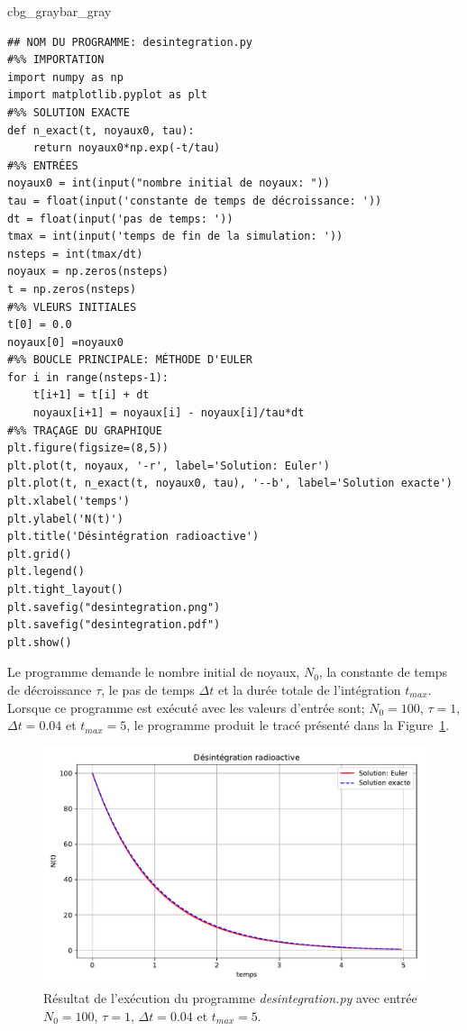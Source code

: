 \documentclass[%
oneside,                 %
final,                   %
10pt]{article}
\newenvironment{_pro_tight}[2]{
   \def\FrameCommand{\color{#2}\vrule width 1mm\normalcolor\colorbox{#1}}
   \FrameRule0.6pt\MakeFramed {\advance\hsize-2mm\FrameRestore}\vskip3mm}
   {\vskip0mm\endMakeFramed}
\newenvironment{pro}[2]{
\bgroup\rmfamily
\fboxsep=0mm\relax
\begin{_pro_tight}{#1}{#2}
\list{}{\parsep=-2mm\parskip=0mm\topsep=0pt\leftmargin=2mm
\rightmargin=2\leftmargin\leftmargin=4pt\relax}
\item\relax}
{\endlist\end{_pro_tight}\egroup}
\begin{document}
\begin{pro}{cbg_gray}{bar_gray}\begin{verbatim}
## NOM DU PROGRAMME: desintegration.py
#%% IMPORTATION
import numpy as np
import matplotlib.pyplot as plt
#%% SOLUTION EXACTE
def n_exact(t, noyaux0, tau):
    return noyaux0*np.exp(-t/tau)
#%% ENTRÉES
noyaux0 = int(input("nombre initial de noyaux: "))
tau = float(input('constante de temps de décroissance: '))
dt = float(input('pas de temps: '))
tmax = int(input('temps de fin de la simulation: '))
nsteps = int(tmax/dt)
noyaux = np.zeros(nsteps)
t = np.zeros(nsteps)
#%% VLEURS INITIALES
t[0] = 0.0
noyaux[0] =noyaux0
#%% BOUCLE PRINCIPALE: MÉTHODE D'EULER
for i in range(nsteps-1):
    t[i+1] = t[i] + dt
    noyaux[i+1] = noyaux[i] - noyaux[i]/tau*dt
#%% TRAÇAGE DU GRAPHIQUE
plt.figure(figsize=(8,5))
plt.plot(t, noyaux, '-r', label='Solution: Euler')
plt.plot(t, n_exact(t, noyaux0, tau), '--b', label='Solution exacte')
plt.xlabel('temps')
plt.ylabel('N(t)')
plt.title('Désintégration radioactive')
plt.grid()
plt.legend()
plt.tight_layout()
plt.savefig("desintegration.png")
plt.savefig("desintegration.pdf")
plt.show()
\end{verbatim}
\end{pro}
\noindent

Le programme demande le nombre initial de noyaux, $N_0$, la constante de temps de décroissance $\tau$, le pas de temps $\Delta t$ et la durée totale de l'intégration $t_{max}$. Lorsque ce programme est exécuté avec les valeurs d'entrée sont; $N_0 = 100$, $\tau = 1$, $\Delta t = 0.04$ et $t_{max} = 5$, le programme produit le tracé présenté dans la Figure~\ref{figout:desintegration}.


\begin{figure}[!ht]  %
  \centerline{\includegraphics[width=0.7\linewidth]{scripts/desintegration.pdf}}
  \caption{
  Résultat de l'exécution du programme \emph{desintegration.py} avec entrée $N_0 = 100$, $\tau = 1$, $\Delta t = 0.04$ et $t_{max} = 5$. \label{figout:desintegration}
  }
\end{figure}
\end{document}
